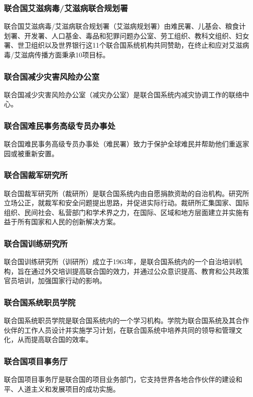 \documentclass[a4paper,openany]{book}
\begin{document}
\subsubsection{联合国艾滋病毒/艾滋病联合规划署}

联合国艾滋病毒/艾滋病联合规划署（艾滋病规划署）由难民署、儿基会、粮食计划署、开发署、人口基金、毒品和犯罪问题办公室、劳工组织、教科文组织、妇女署、世卫组织以及世界银行这11个联合国系统机构共同赞助，在终止和应对艾滋病毒/艾滋病传播方面秉承10项目标。

\subsubsection{联合国减少灾害风险办公室}
联合国减少灾害风险办公室（减灾办公室）是联合国系统内减灾协调工作的联络中心。

\subsubsection{联合国难民事务高级专员办事处}
联合国难民事务高级专员办事处（难民署）致力于保护全球难民并帮助他们重返家园或被重新安置。

\subsubsection{联合国裁军研究所}
联合国裁军研究所（裁研所）是联合国系统内由自愿捐款资助的自治机构。研究所立场公正，就裁军和安全问题提出思路，并促进实际行动。裁研所汇集国家、国际组织、民间社会、私营部门和学术界之力，在国际、区域和地方层面建立并实施有益于所有国家和人民的创新解决方案。

\subsubsection{联合国训练研究所}
联合国训练研究所（训研所）成立于1963年，是联合国系统内的一个自治培训机构，旨在通过外交培训提高联合国的效力，并通过公众意识提高、教育和公共政策官员培训，加强国家行动的影响。

\subsubsection{联合国系统职员学院}
联合国系统职员学院是联合国系统内的一个学习机构。学院为联合国系统及其合作伙伴的工作人员设计并实施学习计划，在联合国系统中培养共同的领导和管理文化，从而提高联合国的效率。

\subsubsection{联合国项目事务厅}
联合国项目事务厅是联合国的项目业务部门，它支持世界各地合作伙伴的建设和平、人道主义和发展项目的成功实施。
\end{document}
